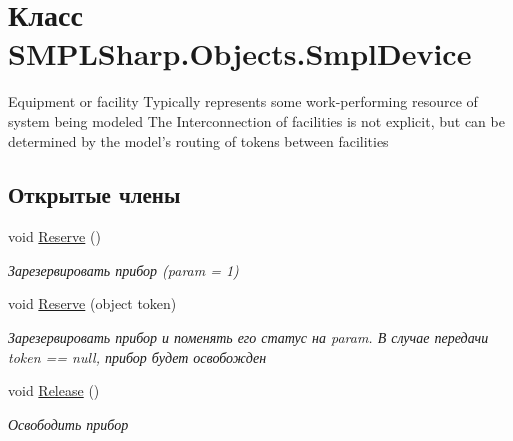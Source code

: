 \hypertarget{class_s_m_p_l_sharp_1_1_objects_1_1_smpl_device}{\section{Класс S\-M\-P\-L\-Sharp.\-Objects.\-Smpl\-Device}
\label{d7/d39/class_s_m_p_l_sharp_1_1_objects_1_1_smpl_device}
}


Equipment or facility Typically represents some work-\/performing resource of system being modeled The Interconnection of facilities is not explicit, but can be determined by the model’s routing of tokens between facilities  


\subsection*{Открытые члены}
\begin{DoxyCompactItemize}
\item 
void \hyperlink{class_s_m_p_l_sharp_1_1_objects_1_1_smpl_device_a43be17c0606bf8f720149c2777a33e31}{Reserve} ()
\begin{DoxyCompactList}\small\item\em Зарезервировать прибор (param = 1) \end{DoxyCompactList}\item 
void \hyperlink{class_s_m_p_l_sharp_1_1_objects_1_1_smpl_device_a8fac05272f1a7e1213336639e3453512}{Reserve} (object token)
\begin{DoxyCompactList}\small\item\em Зарезервировать прибор и поменять его статус на param. В случае передачи token == null, прибор будет освобожден \end{DoxyCompactList}\item 
void \hyperlink{class_s_m_p_l_sharp_1_1_objects_1_1_smpl_device_a81feb298bcfe5e7c87cd0e91a1a329ce}{Release} ()
\begin{DoxyCompactList}\small\item\em Освободить прибор \end{DoxyCompactList}\end{DoxyCompactItemize}
